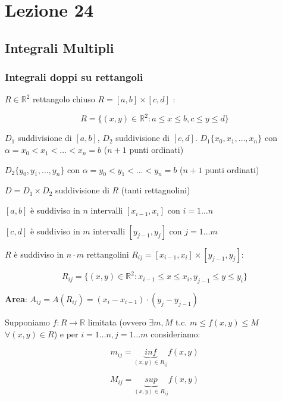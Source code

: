\documentclass[../appunti-analisi.tex]{subfiles}
\begin{document}
\section{Lezione 24}

\subsection{Integrali Multipli}

\subsubsection{Integrali doppi su rettangoli}


$R \in \mathbb{R}^{2}$ rettangolo chiuso $R = [a,b]\times [c,d]$ :

\[
    R = \{(x,y) \in \mathbb{R}^{2}: a \le x \le b, c \le y \le d \}
\]

$D_1$ suddivisione di $[a,b]$, $D_2$ suddivisione di $[c,d]$.
$D_1 \{x_0,x_1,\ldots,x_n\}$ con $\alpha = x_0 < x_1 < \ldots < x_n = b$ ($n+1$ punti ordinati)

$D_2 \{y_0,y_1,\ldots,y_n\}$ con $\alpha = y_0 < y_1 < \ldots < y_n = b$ ($n+1$ punti ordinati)


$D = D_1 \times D_2$ suddivisione di $R$ (tanti rettagnolini)

$[a,b]$ è suddiviso in $n$ intervalli $[x_{i-1}, x_i]$ con $i = 1 \ldots n$

$[c,d]$ è suddiviso in $m$ intervalli $[y_{j-1}, y_j]$ con $j = 1 \ldots m$

$R$ è suddiviso in $n\cdot m$ rettangolini $R_{ij} = [x_{i-1}, x_i] \times [y_{j-1}, y_j]$:

\[
    R_{ij} = \{(x,y) \in \mathbb{R}^{2}: x_{i-1} \le x \le x_i, y_{j-1} \le  y \le y_i\}
\]

\textbf{Area}: $A_{ij} = A(R_{ij}) = (x_i - x_{i-1}) \cdot (y_j - y_{j-1})$


\newpage 

Supponiamo $f: R \rightarrow \mathbb{R}$ limitata (ovvero $\exists m,M$ t.c. $m \le f(x,y) \le M$ $\forall (x,y) \in R$) e per $i=1 \ldots n, j= 1 \ldots m$ consideriamo:

\[
    m_{ij} = \underbrace{inf}_\text{$(x,y) \in R_{ij}$} f(x,y)
\]

\[
    M_{ij} = \underbrace{sup}_\text{$(x,y) \in R_{ij}$} f(x,y)
\]
\end{document}
